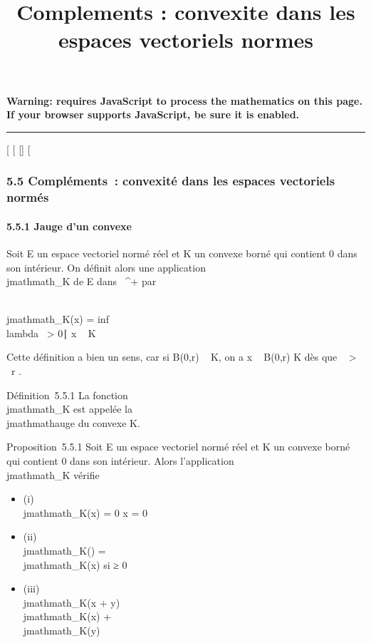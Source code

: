 \documentclass[]{article}
\title{Complements : convexite dans les espaces vectoriels normes}
\author{}
\date{}
\begin{document}
\maketitle

\textbf{Warning: 
requires JavaScript to process the mathematics on this page.\\ If your
browser supports JavaScript, be sure it is enabled.}

\begin{center}\rule{3in}{0.4pt}\end{center}

{[}
{[}
{[}{]}
{[}

\subsubsection{5.5 Compléments~: convexité dans les espaces vectoriels
normés}

\paragraph{5.5.1 Jauge d'un convexe}

Soit E un espace vectoriel normé réel et K un convexe borné qui contient
0 dans son intérieur. On définit alors une application \\jmathmath_K de E
dans ~^+ par

\\jmathmath_K(x) = inf~ \\lambda~
\textgreater{} 0∣ x \over
\lambda~ \in K\

Cette définition a bien un sens, car si B(0,r) \subset~ K, on a  x
\over \lambda~ \in B(0,r) \in K dès que \lambda~ \textgreater{}
\x\
\over r .

Définition~5.5.1 La fonction \\jmathmath_K est appelée la \\jmathmathauge du
convexe K.

Proposition~5.5.1 Soit E un espace vectoriel normé réel et K un convexe
borné qui contient 0 dans son intérieur. Alors l'application
\\jmathmath_K vérifie

\begin{itemize}
\itemsep1pt\parskip0pt
\item
  (i) \\jmathmath_K(x) = 0 \Leftrightarrow x = 0
\item
  (ii) \\jmathmath_K(\mux) = \mu\\jmathmath_K(x) si \mu ≥ 0
\item
  (iii) \\jmathmath_K(x + y) \leq \\jmathmath_K(x) + \\jmathmath_K(y)
\end{itemize}
\end{document}
